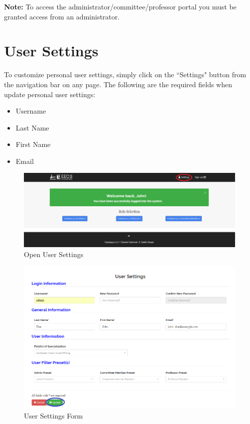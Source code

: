 \documentclass[fontsize=12pt,paper=letter,twoside]{scrartcl}
\begin{document}
\noindent \textbf{Note:} To access the administrator/committee/professor portal you must be granted access from an administrator.

\clearpage
\section{User Settings}
\label{user-settings}
To customize personal user settings, simply click on the ``Settings" button from the navigation bar on any page. The following are the required fields when update personal user settings:
\begin{itemize}
\item Username
\item Last Name
\item First Name
\item Email
\end{itemize}

\begin{figure}[!htb]
\begin{center}
\includegraphics[width=.99\textwidth]{images/click_settings.png}
\end{center}
\caption{Open User Settings}
\label{fig:click_settings}
\end{figure}

\begin{figure}[!htb]
\begin{center}
\includegraphics[width=.99\textwidth]{images/settings_form.png}
\end{center}
\caption{User Settings Form}
\label{fig:settings_form}
\end{figure}
\end{document}
